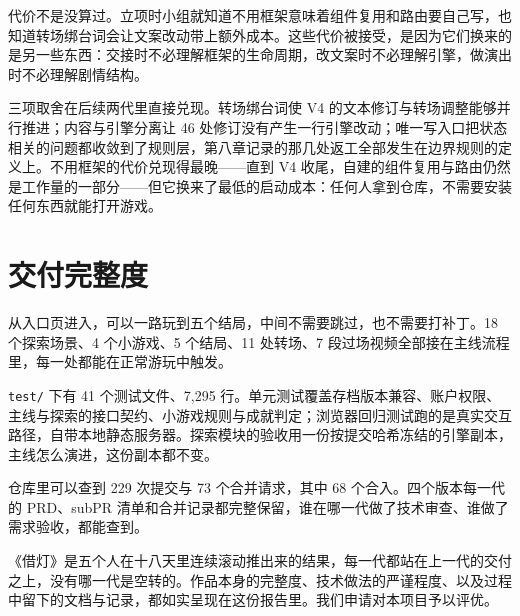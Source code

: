 代价不是没算过。立项时小组就知道不用框架意味着组件复用和路由要自己写，也知道转场绑台词会让文案改动带上额外成本。这些代价被接受，是因为它们换来的是另一些东西：交接时不必理解框架的生命周期，改文案时不必理解引擎，做演出时不必理解剧情结构。

三项取舍在后续两代里直接兑现。转场绑台词使 V4 的文本修订与转场调整能够并行推进；内容与引擎分离让 46 处修订没有产生一行引擎改动；唯一写入口把状态相关的问题都收敛到了规则层，第八章记录的那几处返工全部发生在边界规则的定义上。不用框架的代价兑现得最晚——直到 V4 收尾，自建的组件复用与路由仍然是工作量的一部分——但它换来了最低的启动成本：任何人拿到仓库，不需要安装任何东西就能打开游戏。

\section{交付完整度}

从入口页进入，可以一路玩到五个结局，中间不需要跳过，也不需要打补丁。18 个探索场景、4 个小游戏、5 个结局、11 处转场、7 段过场视频全部接在主线流程里，每一处都能在正常游玩中触发。

\texttt{test/} 下有 41 个测试文件、7{,}295 行。单元测试覆盖存档版本兼容、账户权限、主线与探索的接口契约、小游戏规则与成就判定；浏览器回归测试跑的是真实交互路径，自带本地静态服务器。探索模块的验收用一份按提交哈希冻结的引擎副本，主线怎么演进，这份副本都不变。

仓库里可以查到 229 次提交与 73 个合并请求，其中 68 个合入。四个版本每一代的 PRD、subPR 清单和合并记录都完整保留，谁在哪一代做了技术审查、谁做了需求验收，都能查到。

《借灯》是五个人在十八天里连续滚动推出来的结果，每一代都站在上一代的交付之上，没有哪一代是空转的。作品本身的完整度、技术做法的严谨程度、以及过程中留下的文档与记录，都如实呈现在这份报告里。我们申请对本项目予以评优。
